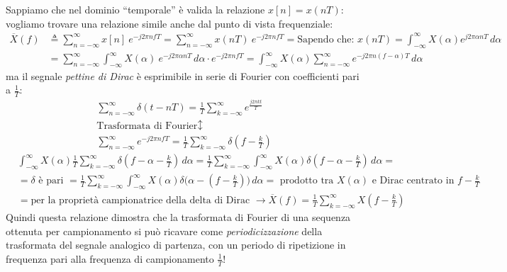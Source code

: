 \documentclass[
]{article}
\begin{document}
\begin{enumerate}
  Sappiamo che nel dominio ``temporale'' è valida la relazione
  \(x[n]=x(nT)\): vogliamo trovare una relazione simile anche dal punto
  di vista frequenziale:\\
  \begin{align*}
  \overline{X}(f) &\triangleq \sum_{n=-\infty}^{\infty} x[n] \ e^{-j2\pi nfT} = \sum_{n=-\infty}^{\infty} x(nT) \ e^{-j2\pi nfT}=
  \boxed{\text{Sapendo che: } x(nT)=\int_{-\infty}^{\infty}X(\alpha) e^{j2\pi\alpha nT}\,d\alpha} \\
  &= \sum_{n=-\infty}^{\infty} \int_{-\infty}^{\infty} X(\alpha) \ e^{-j2\pi \alpha nT} \,d\alpha \cdot e^{-j2\pi nfT}
  = \int_{-\infty}^{\infty} X(\alpha) \sum_{n=-\infty}^{\infty} e^{-j2\pi n(f-\alpha)T} \,d\alpha
  \end{align*} ma il segnale \emph{pettine di Dirac} è esprimibile in
  serie di Fourier con coefficienti pari a \(\frac{1}{T}\): \[
  \displaystyle
  \boxed{\displaystyle
  \begin{array}{c} \displaystyle
  \sum_{n=-\infty}^{\infty} \delta(t-nT) = \frac{1}{T} \sum_{k=-\infty}^{\infty} e^{\frac{j2\pi kt}{T}} \\
  \text{Trasformata di Fourier} \updownarrow \\ \displaystyle
  \sum_{n=-\infty}^{\infty} e^{-j2\pi nfT} = \frac{1}{T}\sum_{k=-\infty}^{\infty} \delta(f-\frac{k}{T})
  \end{array}
  }
  \] \begin{align*}
  &\int_{-\infty}^{\infty}X(\alpha) \frac{1}{T} \sum_{k=-\infty}^{\infty} \delta(f-\alpha -\frac{k}{T})\,d\alpha = \frac{1}{T}\sum_{k=-\infty}^{\infty} \int_{-\infty}^{\infty}X(\alpha) \delta(f-\alpha -\frac{k}{T})\,d\alpha = \\
  &=\delta \text{ è pari } = \frac{1}{T}\sum_{k=-\infty}^{\infty} \int_{-\infty}^{\infty}X(\alpha) \delta\Big(\alpha -(f- \frac{k}{T})\Big)\,d\alpha = \text{ prodotto tra } X(\alpha) \text{ e Dirac centrato in } f -\frac{k}{T} \\
  &=\text{per la proprietà campionatrice della delta di Dirac } \longrightarrow \overline{X}(f) = \frac{1}{T}\sum_{k=-\infty}^{\infty}X(f-\frac{k}{T})
  \end{align*} Quindi questa relazione dimostra che la trasformata di
  Fourier di una sequenza ottenuta per campionamento si può ricavare
  come \emph{periodicizzazione} della trasformata del segnale analogico
  di partenza, con un periodo di ripetizione in frequenza pari alla
  frequenza di campionamento \(\frac{1}{T}\)!
\end{enumerate}
\end{document}
